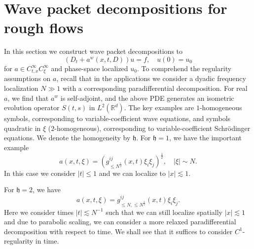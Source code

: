 \documentclass{amsart}
\theoremstyle{definition}
\newcommand{\R}{\mathbb{R}}
\begin{document}
\section{Wave packet decompositions for rough flows}
\label{section:WavePacketDecomposition}

In this section we construct wave packet decompositions to 
\begin{equation}
\label{eq:FirstOrderRoughCoefficients}
(D_t + a^w(x,t,D))u = f, \quad u(0) = u_0
\end{equation}
for $a \in C^{\infty}_{t,x} C_{\xi}^\infty$ and phase-space localized $u_0$. To comprehend the regularity assumptions on $a$, recall that in the applications we consider a dyadic frequency localization $N \gg 1$ with a corresponding paradifferential decomposition. For real $a$, we find that $a^w$ is self-adjoint, and the above PDE generates an isometric evolution operator $S(t,s)$ in $L^2(\R^d)$. 
The key examples are $1$-homogeneous symbols, corresponding to variable-coefficient wave equations, and symbols quadratic in $\xi$ ($2$-homogeneous), corresponding to variable-coefficient Schr\"odinger equations. We denote the homogeneity by $\mathfrak{h}$. For $\mathfrak{h} = 1$, we have the important example
\begin{equation}
\label{eq:1HomogeneousA}
a(x,t,\xi) = (g^{ij}_{\leq N^{\frac{1}{2}}}(x,t) \xi_i \xi_j)^{\frac{1}{2}}, \quad |\xi| \sim N.
\end{equation}
In this case we consider $|t| \leq 1$ and we can localize to $|x| \lesssim 1$.

For $\mathfrak{h} = 2$, we have
\begin{equation}
\label{eq:SchroedingerSymbol}
a(x,t,\xi) = g^{ij}_{\leq N, \leq N^{\frac{1}{2}}}(x,t) \xi_i \xi_j.
\end{equation} 
Here we consider times $|t| \lesssim N^{-1}$ such that we can still localize spatially $|x| \lesssim 1$ and due to parabolic scaling, we can consider a more relaxed paradifferential decomposition with respect to time. We shall see that it suffices to consider $C^1$-regularity in time.

\smallskip
\end{document}
